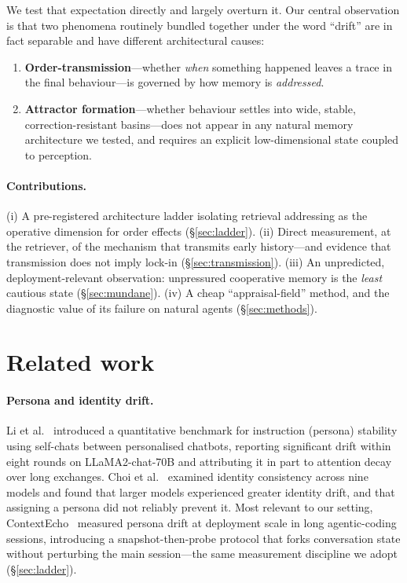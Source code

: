 \documentclass[11pt]{article}
\begin{document}
We test that expectation directly and largely overturn it. Our central observation is
that two phenomena routinely bundled together under the word ``drift'' are in fact
separable and have different architectural causes:

\begin{enumerate}\itemsep0.15em
\item \textbf{Order-transmission}---whether \emph{when} something happened leaves a
trace in the final behaviour---is governed by how memory is \emph{addressed}.
\item \textbf{Attractor formation}---whether behaviour settles into wide, stable,
correction-resistant basins---does not appear in any natural memory architecture we
tested, and requires an explicit low-dimensional state coupled to perception.
\end{enumerate}

\paragraph{Contributions.}
(i) A pre-registered architecture ladder isolating retrieval addressing as the
operative dimension for order effects (\S\ref{sec:ladder}).
(ii) Direct measurement, at the retriever, of the mechanism that transmits early
history---and evidence that transmission does not imply lock-in
(\S\ref{sec:transmission}).
(iii) An unpredicted, deployment-relevant observation: unpressured cooperative memory
is the \emph{least} cautious state (\S\ref{sec:mundane}).
(iv) A cheap ``appraisal-field'' method, and the diagnostic value of its failure on
natural agents (\S\ref{sec:methods}).

\section{Related work}

\paragraph{Persona and identity drift.}
Li et al.~\cite{li2024persona} introduced a quantitative benchmark for instruction
(persona) stability using self-chats between personalised chatbots, reporting significant drift
within eight rounds on LLaMA2-chat-70B and attributing it in part to attention decay
over long exchanges. Choi et al.~\cite{choi2024identity} examined identity consistency
across nine models and found that larger models experienced greater identity drift,
and that assigning a persona did not reliably prevent it. Most relevant to our
setting, ContextEcho~\cite{contextecho2026} measured persona drift at deployment scale
in long agentic-coding sessions, introducing a snapshot-then-probe protocol that forks
conversation state without perturbing the main session---the same measurement
discipline we adopt (\S\ref{sec:ladder}).
\end{document}
